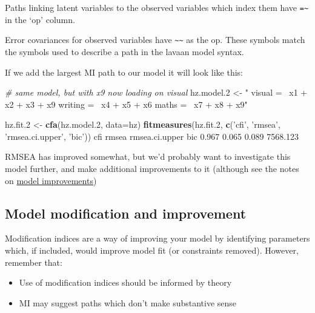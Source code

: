 \documentclass[]{article}
\newenvironment{Shaded}{\begin{snugshade}}{\end{snugshade}}
\newcommand{\CommentTok}[1]{\textcolor[rgb]{0.56,0.35,0.01}{\textit{#1}}}
\newcommand{\DataTypeTok}[1]{\textcolor[rgb]{0.13,0.29,0.53}{#1}}
\newcommand{\FloatTok}[1]{\textcolor[rgb]{0.00,0.00,0.81}{#1}}
\newcommand{\KeywordTok}[1]{\textcolor[rgb]{0.13,0.29,0.53}{\textbf{#1}}}
\newcommand{\NormalTok}[1]{#1}
\newcommand{\StringTok}[1]{\textcolor[rgb]{0.31,0.60,0.02}{#1}}
\providecommand{\tightlist}{%
  \setlength{\itemsep}{0pt}\setlength{\parskip}{0pt}}
\begin{document}
Paths linking latent variables to the observed variables which index them have
\texttt{=\textasciitilde{}} in the `op' column.

Error covariances for observed variables have \texttt{\textasciitilde{}\textasciitilde{}} as the op. These symbols
match the symbols used to describe a path in the lavaan model syntax.

If we add the largest MI path to our model it will look like this:

\begin{Shaded}
\begin{Highlighting}[]
\CommentTok{# same model, but with x9 now loading on visual}
\NormalTok{hz.model}\FloatTok{.2}\NormalTok{ <-}\StringTok{ "}
\StringTok{visual =~ x1 + x2 + x3 + x9}
\StringTok{writing =~ x4 + x5 + x6}
\StringTok{maths =~ x7 + x8 + x9"}

\NormalTok{hz.fit}\FloatTok{.2}\NormalTok{ <-}\StringTok{ }\KeywordTok{cfa}\NormalTok{(hz.model}\FloatTok{.2}\NormalTok{, }\DataTypeTok{data=}\NormalTok{hz)}
\KeywordTok{fitmeasures}\NormalTok{(hz.fit}\FloatTok{.2}\NormalTok{, }\KeywordTok{c}\NormalTok{(}\StringTok{'cfi'}\NormalTok{, }\StringTok{'rmsea'}\NormalTok{, }\StringTok{'rmsea.ci.upper'}\NormalTok{, }\StringTok{'bic'}\NormalTok{))}
\NormalTok{           cfi          rmsea rmsea.ci.upper            bic }
         \FloatTok{0.967}          \FloatTok{0.065}          \FloatTok{0.089}       \FloatTok{7568.123} 
\end{Highlighting}
\end{Shaded}

RMSEA has improved somewhat, but we'd probably want to investigate this model
further, and make additional improvements to it (although see the notes on
\protect\hyperlink{model-improvement}{model improvements})

\hypertarget{model-improvement}{%
\subsection*{Model modification and improvement}\label{model-improvement}}

Modification indices are a way of improving your model by identifying parameters
which, if included, would improve model fit (or constraints removed). However,
remember that:

\begin{itemize}
\tightlist
\item
  Use of modification indices should be informed by theory
\item
  MI may suggest paths which don't make substantive sense
\end{itemize}
\end{document}
